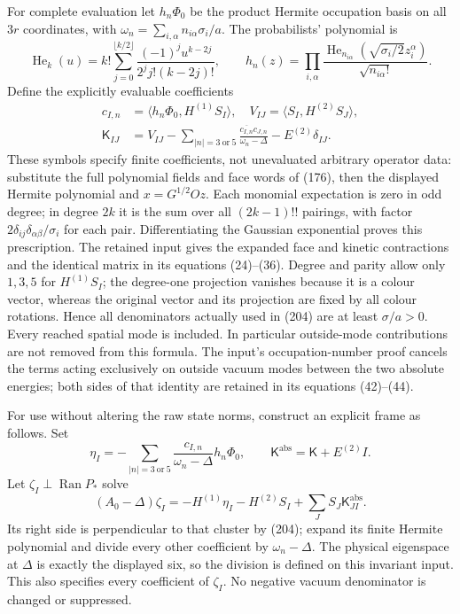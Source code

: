 \documentclass[11pt]{article}
\begin{document}
For complete evaluation let $h_n\Phi_0$ be the product Hermite
occupation basis on all $3r$ coordinates, with
$\omega_n=\sum_{i,\alpha}n_{i\alpha}\sigma_i/a$.
The probabilists' polynomial is
\[
 \operatorname{He}_k(u)=k!\sum_{j=0}^{\lfloor k/2\rfloor}
 \frac{(-1)^j u^{k-2j}}{2^j j!(k-2j)!},\qquad
 h_n(z)=\prod_{i,\alpha}
 \frac{\operatorname{He}_{n_{i\alpha}}(\sqrt{\sigma_i/2}z_i^\alpha)}
      {\sqrt{n_{i\alpha}!}}.
\]
Define the explicitly evaluable coefficients
\begin{align}
 c_{I,n}&=\langle h_n\Phi_0,H^{(1)}S_I\rangle,\quad
 V_{IJ}=\langle S_I,H^{(2)}S_J\rangle,\nonumber\\
 \mathsf K_{IJ}&=V_{IJ}
   -\sum_{|n|=3\ \mathrm{or}\ 5}
                  \frac{\overline{c_{I,n}}c_{J,n}}{\omega_n-\Delta}
   -E^{(2)}\delta_{IJ}.
 \label{eq:band-full-K}
\end{align}
These symbols specify finite coefficients, not unevaluated arbitrary
operator data: substitute the full polynomial fields and face words
of (176), then the displayed Hermite polynomial and
$x=G^{1/2}Oz$. Each monomial expectation is zero in odd degree;
in degree $2k$ it is the sum over all $(2k-1)!!$ pairings, with
factor $2\delta_{ij}\delta_{\alpha\beta}/\sigma_i$ for each pair.
Differentiating the Gaussian exponential proves this prescription.
The retained input gives the expanded face and kinetic contractions
and the identical matrix in its equations (24)--(36).
Degree and parity allow only $1,3,5$ for $H^{(1)}S_I$;
the degree-one projection vanishes because it is a colour vector,
whereas the original vector and its projection are fixed by all
colour rotations. Hence all denominators actually used in
(204) are at least $\sigma/a>0$. Every reached
spatial mode is included. In particular outside-mode contributions
are not removed from this formula. The input's occupation-number
proof cancels the terms acting exclusively on outside vacuum modes
between the two absolute energies; both sides of that identity are
retained in its equations (42)--(44).

For use without altering the raw state norms, construct an explicit
frame as follows. Set
\[
 \eta_I=-\sum_{|n|=3\ \mathrm{or}\ 5}
              \frac{c_{I,n}}{\omega_n-\Delta}h_n\Phi_0,
 \qquad \mathsf K^{\mathrm{abs}}=\mathsf K+E^{(2)}I.
\]
Let $\zeta_I\perp\operatorname{Ran}P_*$ solve
\begin{equation}\label{eq:band-zeta}
 (A_0-\Delta)\zeta_I
 =-H^{(1)}\eta_I-H^{(2)}S_I+\sum_JS_J\mathsf K^{\mathrm{abs}}_{JI}.
\end{equation}
Its right side is perpendicular to that cluster by
(204); expand its finite Hermite polynomial and
divide every other coefficient by $\omega_n-\Delta$.
The physical eigenspace at $\Delta$ is exactly the displayed six,
so the division is defined on this invariant input. This also
specifies every coefficient of $\zeta_I$. No negative vacuum
denominator is changed or suppressed.
\end{document}
